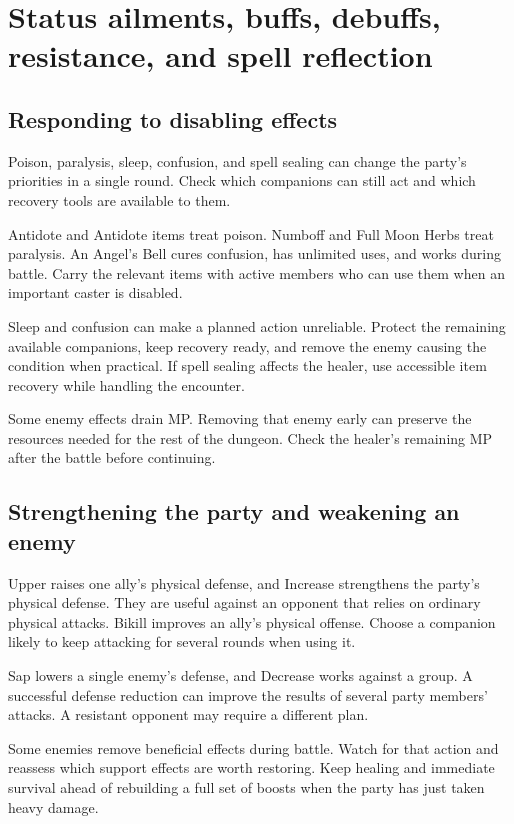 \section{Status ailments, buffs, debuffs, resistance, and spell reflection}

\subsection*{Responding to disabling effects}

Poison, paralysis, sleep, confusion, and spell sealing can change the
party's priorities in a single round. Check which companions can still
act and which recovery tools are available to them.

Antidote and Antidote items treat poison. Numboff and Full Moon Herbs
treat paralysis. An Angel's Bell cures confusion, has unlimited uses,
and works during battle.
Carry the relevant items with active members who can use them when an
important caster is disabled.

Sleep and confusion can make a planned action unreliable. Protect the
remaining available companions, keep recovery ready, and remove the
enemy causing the condition when practical. If spell sealing affects
the healer, use accessible item recovery while handling the encounter.

Some enemy effects drain MP. Removing that enemy early can preserve the
resources needed for the rest of the dungeon. Check the healer's remaining
MP after the battle before continuing.

\subsection*{Strengthening the party and weakening an enemy}

Upper raises one ally's physical defense, and Increase strengthens the
party's physical defense. They are useful against an opponent that relies
on ordinary physical attacks. Bikill improves an ally's physical offense.
Choose a companion likely to keep attacking for several rounds when using it.

Sap lowers a single enemy's defense, and Decrease works against a group.
A successful defense reduction can improve the results of several party
members' attacks. A resistant opponent may require a different plan.

Some enemies remove beneficial effects during battle. Watch for that
action and reassess which support effects are worth restoring. Keep
healing and immediate survival ahead of rebuilding a full set of boosts
when the party has just taken heavy damage.

